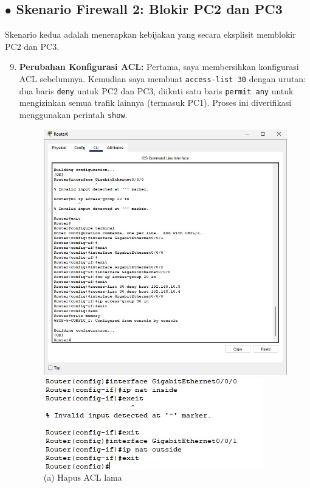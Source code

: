 \subsection*{$\bullet$ Skenario Firewall 2: Blokir PC2 dan PC3}
Skenario kedua adalah menerapkan kebijakan yang secara eksplisit memblokir PC2 dan PC3.
\begin{enumerate}
    \setcounter{enumi}{8}
    \item \textbf{Perubahan Konfigurasi ACL:} Pertama, saya membersihkan konfigurasi ACL sebelumnya. Kemudian saya membuat \texttt{access-list 30} dengan urutan: dua baris \texttt{deny} untuk PC2 dan PC3, diikuti satu baris \texttt{permit any} untuk mengizinkan semua trafik lainnya (termasuk PC1). Proses ini diverifikasi menggunakan perintah \texttt{show}.
     \begin{figure}[H]
        \centering
        \begin{minipage}{0.32\textwidth}
            \centering
            \includegraphics[width=\textwidth]{img4/removeACL30.jpeg}
            \caption*{(a) Hapus ACL lama}
        \end{minipage}\hfill
        \begin{minipage}{0.32\textwidth}
            \centering
            \includegraphics[width=\textwidth]{img4/AddACL30.jpeg}

\end{minipage}
\end{figure}
\end{enumerate}

